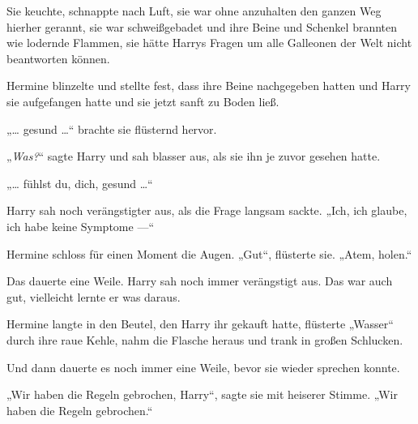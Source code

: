 Sie keuchte, schnappte nach Luft, sie war ohne anzuhalten den ganzen Weg hierher gerannt, sie war schweißgebadet und ihre Beine und Schenkel brannten wie lodernde Flammen, sie hätte Harrys Fragen um alle Galleonen der Welt nicht beantworten können.

Hermine blinzelte und stellte fest, dass ihre Beine nachgegeben hatten und Harry sie aufgefangen hatte und sie jetzt sanft zu Boden ließ.

„… gesund …“ brachte sie flüsternd hervor.

„\emph{Was?}“ sagte Harry und sah blasser aus, als sie ihn je zuvor gesehen hatte.

„… fühlst du, dich, gesund …“

Harry sah noch verängstigter aus, als die Frage langsam sackte.
„Ich, ich glaube, ich habe keine Symptome —“

Hermine schloss für einen Moment die Augen.
„Gut“, flüsterte sie.
„Atem, holen.“

Das dauerte eine Weile. Harry sah noch immer verängstigt aus. Das war auch gut, vielleicht lernte er was daraus.

Hermine langte in den Beutel, den Harry ihr gekauft hatte, flüsterte
„Wasser“ durch ihre raue Kehle, nahm die Flasche heraus und trank in großen Schlucken.

Und dann dauerte es noch immer eine Weile, bevor sie wieder sprechen konnte.

„Wir haben die Regeln gebrochen, Harry“, sagte sie mit heiserer Stimme.
„Wir haben die Regeln gebrochen.“

